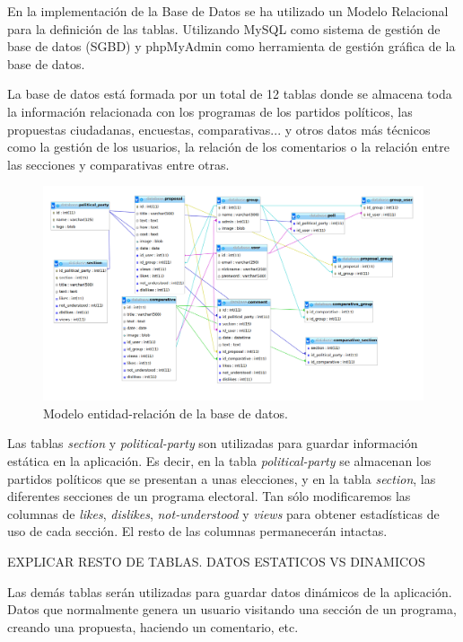 En la implementación de la Base de Datos se ha utilizado un Modelo Relacional para la definición de las tablas. Utilizando MySQL \cite{ref:MySQL} como sistema de gestión de base de datos (SGBD) y phpMyAdmin \cite{ref:phpMyAdmin} como herramienta de gestión gráfica de la base de datos.

La base de datos está formada por un total de 12 tablas donde se almacena toda la información relacionada con los programas de los partidos políticos, las propuestas ciudadanas, encuestas, comparativas... y otros datos más técnicos como la gestión de los usuarios, la relación de los comentarios o la relación entre las secciones y comparativas entre otras.

\begin{figure}[H]
\centering
\includegraphics[keepaspectratio, scale=0.30]{Media/Captures/database.png}
\caption{Modelo entidad-relación de la base de datos.}
\label{fig:ermodel}
\end{figure}

Las tablas \textit{section} y \textit{political-party} son utilizadas para guardar información estática en la aplicación. Es decir, en la tabla \textit{political-party} se almacenan los partidos políticos que se presentan a unas elecciones, y en la tabla \textit{section}, las diferentes secciones de un programa electoral. Tan sólo modificaremos las columnas de \textit{likes}, \textit{dislikes}, \textit{not-understood} y \textit{views} para obtener estadísticas de uso de cada sección. El resto de las columnas permanecerán intactas.

EXPLICAR RESTO DE TABLAS. DATOS ESTATICOS VS DINAMICOS

Las demás tablas serán utilizadas para guardar datos dinámicos de la aplicación. Datos que normalmente genera un usuario visitando una sección de un programa, creando una propuesta, haciendo un comentario, etc.

